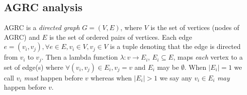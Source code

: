 \subsection{AGRC analysis}
\label{sec:agrc-analysis}


AGRC is a \textit{directed graph} $G =(V,E)$, where $V$ is the set of
vertices (nodes of AGRC) and $E$ is the set of ordered pairs of
vertices. Each edge
$e = (v_i,v_j), \forall e \in E, v_i \in V, v_j \in V$ is a tuple
denoting that the edge is directed from $v_i$ to $v_j$.  Then a lambda
function $\lambda:v \rightarrow E_i$, $E_i \subseteq E$, maps
\textit{each} vertex to a set of edge(s) where
$\forall (v_i,v_j) \in E_i, v_j = v$ and $E_i$ may be $\emptyset$. When
$|E_i| = 1$ we call $v_i$ \textit{must} happen before $v$ whereas when
$|E_i| > 1$ we say any $v_i \in E_i$ \textit{may} happen before $v$.

